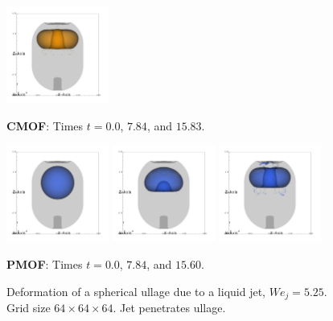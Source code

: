 \documentclass[preprint,12pt]{Definitions/elsarticle}
\begin{document}
\begin{figure}[H]
\begin{minipage}[b]{1\linewidth}
		\includegraphics[width=0.3\textwidth]{jet2_cmof3.png} 
		\vspace{-1em}
		\caption*{\textbf{CMOF}: Times $t=0.0$, $7.84$, and $15.83$. }
		\label{3DWEJ5p25cmof}
	\end{minipage}
	\begin{minipage}[b]{1\linewidth}
		\centering
		\includegraphics[width=0.3\textwidth]{jet2_pmof1.png} 
		\includegraphics[width=0.3\textwidth]{jet2_pmof2.png} 
		\includegraphics[width=0.3\textwidth]{jet2_pmof3.png} 
		\vspace{-1em}
		\caption*{\textbf{PMOF}: Times $t=0.0$, $7.84$, and $15.60$.
			}
		\label{3DWEJ5p25plsmof}
	\end{minipage}
	\caption{Deformation of a spherical ullage due to a liquid jet, $We_{j}=5.25$. Grid size $64\times 64\times 64$. Jet penetrates ullage.}
\end{figure}
\end{document}
